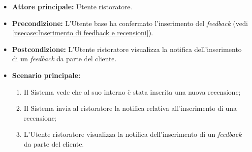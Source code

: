 \label{usecase:Visualizzazione notifica di inserimento feedback}
\begin{itemize}
	\item \textbf{Attore principale:} Utente ristoratore.

	\item \textbf{Precondizione:} L'Utente base ha confermato l'inserimento del \textit{feedback} (vedi \autoref{usecase:Inserimento di feedback e recensioni}).

	\item \textbf{Postcondizione:} L'Utente ristoratore visualizza la notifica dell'inserimento di un \textit{feedback} da parte del cliente.

	\item \textbf{Scenario principale:}
	      \begin{enumerate}
		      \item Il Sistema vede che al suo interno è stata inserita una nuova recensione;
		      \item Il Sistema invia al ristoratore la notifica relativa all'inserimento di una recensione;
		      \item L'Utente ristoratore visualizza la notifica dell'inserimento di un \textit{feedback} da parte del cliente.
	      \end{enumerate}
\end{itemize}
